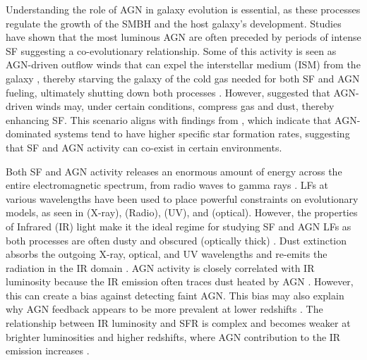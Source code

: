 Understanding the role of AGN in galaxy evolution is essential, as these processes regulate the growth of the SMBH and the host galaxy's development. Studies have shown that the most luminous AGN are often preceded by periods of intense SF \citep{kauffmann_host_2003, hopkins_cosmological_2008, hopkins_how_2010} suggesting a co-evolutionary relationship. Some of this activity is seen as AGN-driven outflow winds that can expel the interstellar medium (ISM) from the galaxy \citep{schawinski_observational_2007, cicone_massive_2014, fiore_agn_2017}, thereby starving the galaxy of the cold gas needed for both SF and AGN fueling, ultimately shutting down both processes \citep{hopkins_how_2010}. However, \cite{silk_unleashing_2013} suggested that AGN-driven winds may, under certain conditions, compress gas and dust, thereby enhancing SF. This scenario aligns with findings from \citet{cowley_zfourge_2016}, which indicate that AGN-dominated systems tend to have higher specific star formation rates, suggesting that SF and AGN activity can co-exist in certain environments.

Both SF and AGN activity releases an enormous amount of energy across the entire electromagnetic spectrum, from radio waves to gamma rays \citep{ho_spectral_1999, huang_local_2007, silva_modelling_2011, gruppioni_modelling_2011}. LFs at various wavelengths have been used to place powerful constraints on evolutionary models, as seen in \cite{aird_evolution_2015, alqasim_new_2023} (X-ray), \cite{yuan_determining_2018} (Radio), \cite{page_ultraviolet_2021} (UV), and \cite{cool_galaxy_2012} (optical). However, the properties of Infrared (IR) light make it the ideal regime for studying SF and AGN LFs as both processes are often dusty and obscured (optically thick) \citep{wu_mid-infrared_2011, han_evolution_2012}. Dust extinction absorbs the outgoing X-ray, optical, and UV wavelengths and re-emits the radiation in the IR domain \citep{fu_decomposing_2010, toba_9_2013, oconnor_luminosity_2016, symeonidis_agn_2021}. AGN activity is closely correlated with IR luminosity because the IR emission often traces dust heated by AGN \citep{kauffmann_host_2003, wu_mid-infrared_2011, symeonidis_what_2019, symeonidis_agn_2021}. However, this can create a bias against detecting faint AGN. This bias may also explain why AGN feedback appears to be more prevalent at lower redshifts \citep{katsianis_evolution_2017, pouliasis_obscured_2020}. The relationship between IR luminosity and SFR is complex \citep{symeonidis_agn_2021} and becomes weaker at brighter luminosities and higher redshifts, where AGN contribution to the IR emission increases \citep{wu_mid-infrared_2011}. 

